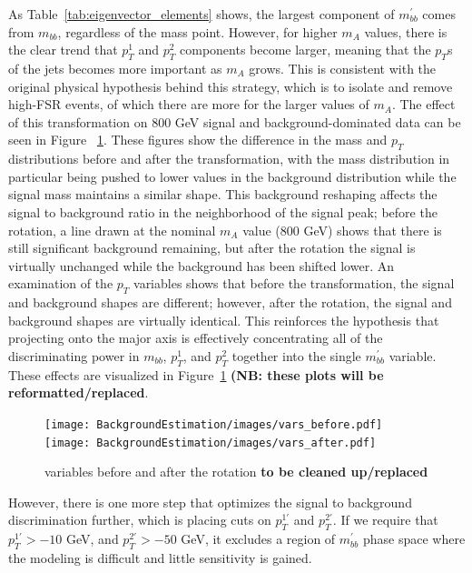 As Table~\ref{tab:eigenvector_elements} shows, the largest component of
$m_{bb}^{'}$ comes from $m_{bb}$, regardless of the mass point.  However,
for higher $m_A$ values, there is the clear trend that $p_T^1$ and $p_T^2$
components become larger, meaning that the $p_T$s of the jets becomes 
more important as $m_A$ grows.  This is consistent with the original 
physical hypothesis behind this strategy, which is to isolate and remove
high-FSR events, of which there are more for the larger values of $m_A$. 
The effect of this transformation on 800 GeV signal and background-dominated
data can be seen in Figure ~\ref{fig:transformed_vars}.  These figures show
the difference in the mass and $p_T$ distributions before and after the transformation,
with the mass distribution in particular being pushed to lower values
in the background distribution while the signal mass maintains a similar shape.  
This background reshaping affects the signal to background ratio in the 
neighborhood of the signal peak; before the rotation,
a line drawn at the nominal $m_A$ value (800 GeV) shows that there is still
significant background remaining, but after the rotation the signal is virtually
unchanged while the background has been shifted lower.  An examination of the
$p_T$ variables shows that before the transformation, the signal and background
shapes are different; however, after the rotation, the signal and background
shapes are virtually identical.  This reinforces the hypothesis that projecting
onto the major axis is effectively concentrating all of the discriminating 
power in $m_{bb}$, $p_T^1$, and $p_T^2$ together into the single $m_{bb}^{'}$
variable.  These effects are visualized in Figure~\ref{fig:transformed_vars}
\textbf{(NB: these plots will be reformatted/replaced}. 

\begin{figure}[hbt]
\texttt{[image: BackgroundEstimation/images/vars\_before.pdf]}
\texttt{[image: BackgroundEstimation/images/vars\_after.pdf]}
\caption{variables before and after the rotation \textbf{to be cleaned up/replaced} \label{fig:transformed_vars}}
\end{figure}

However, there is one more step that optimizes the signal to background
discrimination further, which is placing cuts on $p_T^{1'}$ and $p_T^{2'}$.
If we require that $p_T^{1'}>-10$ GeV, and $p_T^{2'}>-50$ GeV, it 
excludes a region of $m_{bb}^{'}$ phase space where the modeling is difficult
and little sensitivity is gained.  








